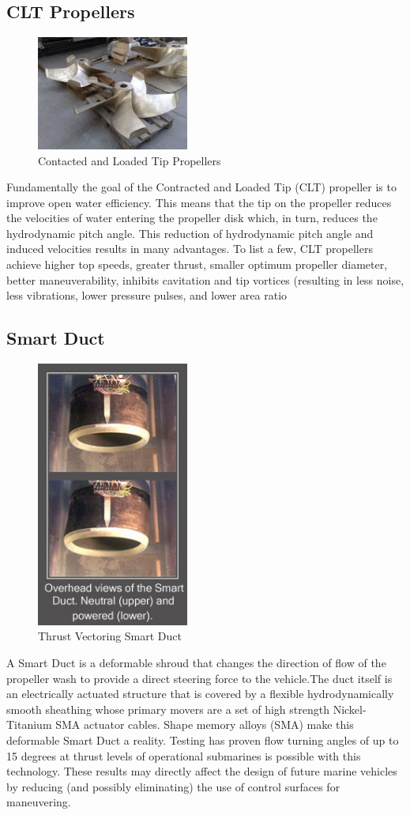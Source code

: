 \documentclass{report}
\begin{document}
\subsection{CLT Propellers}
\begin{figure}[h]
\centering
\includegraphics[width=5cm]{"CLT"}
\caption{Contacted and Loaded Tip Propellers}
\end{figure}
Fundamentally the goal of the Contracted and Loaded Tip (CLT) propeller is to improve open water efficiency.  This means that the tip on the propeller reduces the velocities of water entering the propeller disk which, in turn, reduces the hydrodynamic pitch angle.  This reduction of hydrodynamic pitch angle and induced velocities results in many advantages.  To list a few, CLT propellers achieve higher top speeds, greater thrust, smaller optimum propeller diameter, better maneuverability, inhibits cavitation and tip vortices (resulting in less noise, less vibrations, lower pressure pulses, and lower area ratio
\subsection{Smart Duct}
\begin{figure}[h]
\centering
\includegraphics[width=5cm]{"Smart Duct"}
\caption{Thrust Vectoring Smart Duct}
\end{figure}
A Smart Duct is a deformable shroud that changes the direction of flow of the propeller wash to provide a direct steering force to the vehicle.The duct itself is an electrically actuated structure that is covered by a flexible hydrodynamically smooth sheathing whose primary movers are a set of high strength Nickel-Titanium SMA actuator cables.  Shape memory alloys (SMA) make this deformable Smart Duct a reality. Testing has proven flow turning angles of up to 15 degrees at thrust levels of operational submarines is possible with this technology.  These results may directly affect the design of future marine vehicles by reducing (and possibly eliminating) the use of control surfaces for maneuvering.
\end{document}
